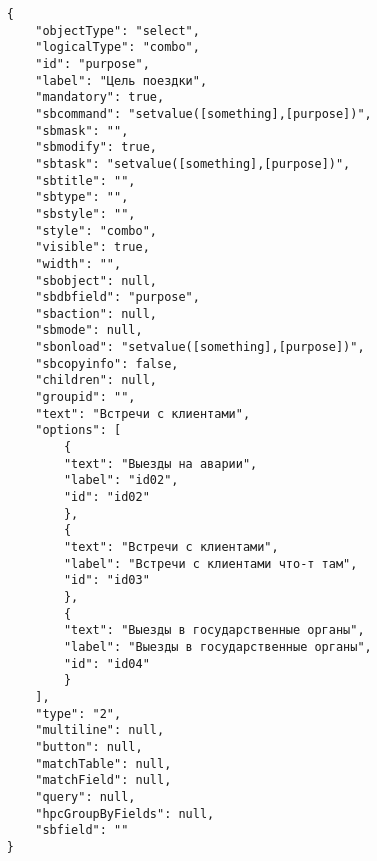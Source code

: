 \documentclass[../index.tex]{subfiles}
\begin{document}
\begin{verbatim}
	{
		"objectType": "select",
		"logicalType": "combo",
		"id": "purpose",
		"label": "Цель поездки",
		"mandatory": true,
		"sbcommand": "setvalue([something],[purpose])",
		"sbmask": "",
		"sbmodify": true,
		"sbtask": "setvalue([something],[purpose])",
		"sbtitle": "",
		"sbtype": "",
		"sbstyle": "",
		"style": "combo",
		"visible": true,
		"width": "",
		"sbobject": null,
		"sbdbfield": "purpose",
		"sbaction": null,
		"sbmode": null,
		"sbonload": "setvalue([something],[purpose])",
		"sbcopyinfo": false,
		"children": null,
		"groupid": "",
		"text": "Встречи с клиентами",
		"options": [
			{
			"text": "Выезды на аварии",
			"label": "id02",
			"id": "id02"
			},
			{
			"text": "Встречи с клиентами",
			"label": "Встречи с клиентами что-т там",
			"id": "id03"
			},
			{
			"text": "Выезды в государственные органы",
			"label": "Выезды в государственные органы",
			"id": "id04"
			}
		],
		"type": "2",
		"multiline": null,
		"button": null,
		"matchTable": null,
		"matchField": null,
		"query": null,
		"hpcGroupByFields": null,
		"sbfield": ""
	}
\end{verbatim}
\end{document}

